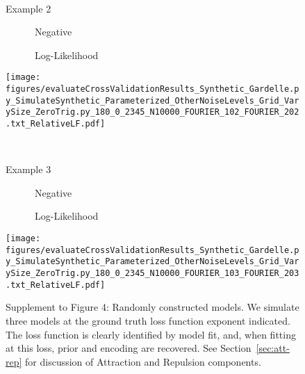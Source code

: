 \begin{figure}
\ 

Example 2

\begin{minipage}[c]{0.8\linewidth}

\end{minipage}
\begin{minipage}[c]{0.19\linewidth}
\centering

\ \ \ \ \ \ Negative

\ \ \ \ \ \ Log-Likelihood

\texttt{[image: figures/evaluateCrossValidationResults\_Synthetic\_Gardelle.py\_SimulateSynthetic\_Parameterized\_OtherNoiseLevels\_Grid\_VarySize\_ZeroTrig.py\_180\_0\_2345\_N10000\_FOURIER\_102\_FOURIER\_202.txt\_RelativeLF.pdf]}
\end{minipage}

\ 

Example 3

\begin{minipage}[c]{0.8\linewidth}

\end{minipage}
\begin{minipage}[c]{0.19\linewidth}
\centering

\ \ \ \ \ \ Negative

\ \ \ \ \ \ Log-Likelihood


\texttt{[image: figures/evaluateCrossValidationResults\_Synthetic\_Gardelle.py\_SimulateSynthetic\_Parameterized\_OtherNoiseLevels\_Grid\_VarySize\_ZeroTrig.py\_180\_0\_2345\_N10000\_FOURIER\_103\_FOURIER\_203.txt\_RelativeLF.pdf]}
\end{minipage}


\caption{Supplement to Figure 4: Randomly constructed models.
We simulate three models at the ground truth loss function exponent indicated.
The loss function is clearly identified by model fit, and, when fitting at this loss, prior and encoding are recovered.
See Section~\ref{sec:att-rep} for discussion of Attraction and Repulsion components.
}
\label{fig:fourier-0}
\end{figure}



